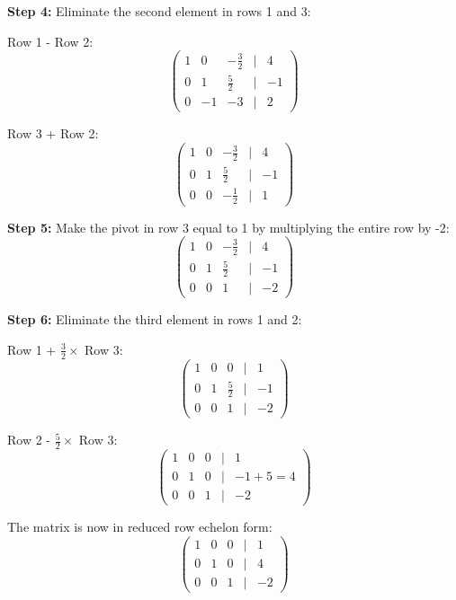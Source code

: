 \textbf{Step 4:} Eliminate the second element in rows 1 and 3:

Row 1 - Row 2:
\begin{equation*}
\begin{pmatrix}
1 & 0 & -\frac{3}{2} & | & 4 \\
0 & 1 & \frac{5}{2} & | & -1 \\
0 & -1 & -3 & | & 2
\end{pmatrix}
\end{equation*}

Row 3 + Row 2:
\begin{equation*}
\begin{pmatrix}
1 & 0 & -\frac{3}{2} & | & 4 \\
0 & 1 & \frac{5}{2} & | & -1 \\
0 & 0 & -\frac{1}{2} & | & 1
\end{pmatrix}
\end{equation*}

\textbf{Step 5:} Make the pivot in row 3 equal to 1 by multiplying the entire row by -2:
\begin{equation*}
\begin{pmatrix}
1 & 0 & -\frac{3}{2} & | & 4 \\
0 & 1 & \frac{5}{2} & | & -1 \\
0 & 0 & 1 & | & -2
\end{pmatrix}
\end{equation*}

\textbf{Step 6:} Eliminate the third element in rows 1 and 2:

Row 1 + \(\frac{3}{2} \times\) Row 3:
\begin{equation*}
\begin{pmatrix}
1 & 0 & 0 & | & 1 \\
0 & 1 & \frac{5}{2} & | & -1 \\
0 & 0 & 1 & | & -2
\end{pmatrix}
\end{equation*}

Row 2 - \(\frac{5}{2} \times\) Row 3:
\begin{equation*}
\begin{pmatrix}
1 & 0 & 0 & | & 1 \\
0 & 1 & 0 & | & -1 + 5 = 4 \\
0 & 0 & 1 & | & -2
\end{pmatrix}
\end{equation*}

The matrix is now in reduced row echelon form:
\begin{equation*}
\begin{pmatrix}
1 & 0 & 0 & | & 1 \\
0 & 1 & 0 & | & 4 \\
0 & 0 & 1 & | & -2
\end{pmatrix}
\end{equation*}

